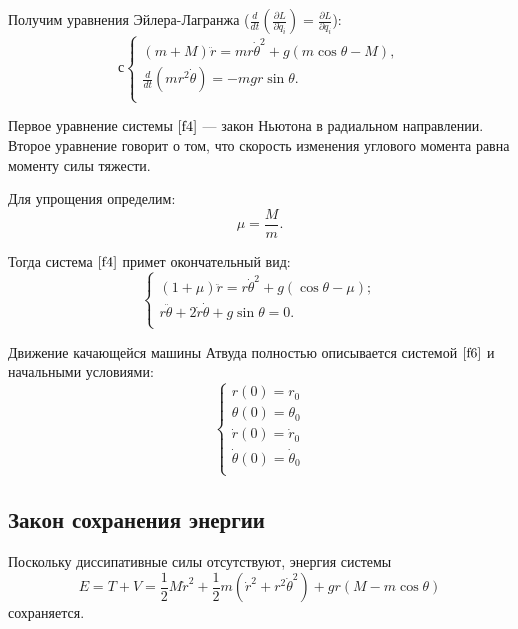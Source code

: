\documentclass[12pt]{article}
\numberwithin{equation}{section}
\begin{document}
Получим уравнения Эйлера-Лагранжа ($ \frac{d}{dt}(\frac{\partial L}{\partial \dot{q}_{i}}) = \frac{\partial L}{\partial q_{i}} $):
\begin{equation}\label{f4}
с\begin{cases}
(m+M)\ddot{r} = m r \dot{\theta}^{2}+g(m \cos\theta - M),\\
\frac{d}{dt}(mr^{2}\dot{\theta})=-mgr\sin\theta.\\
\end{cases}
\end{equation}

Первое уравнение системы $\ref{f4}$  — закон Ньютона в радиальном направлении. Второе уравнение говорит о том, что скорость изменения углового момента равна моменту силы тяжести.

Для упрощения определим:
\begin{equation}\label{f5}
\mu=\frac{M}{m}.
\end{equation}

Тогда система $\ref{f4}$ примет окончательный вид:
\begin{equation}\label{f6}
\begin{cases}
(1+\mu)\ddot{r} = r \dot{\theta}^{2}+g( \cos\theta - \mu);\\
r\ddot{\theta}+2 \dot{r} \dot{\theta}+ g \sin\theta=0.\\
\end{cases}
\end{equation}

Движение качающейся машины Атвуда полностью описывается системой $\ref{f6}$ и начальными условиями:
\begin{equation}\label{f7}
\begin{cases}
r(0)=r_{0}\\
\theta(0)=\theta_{0}\\
\dot r(0)=\dot r_{0}\\
\dot \theta(0)=\dot \theta_{0}\\
\end{cases}
\end{equation}
\subsection{Закон сохранения энергии}
Поскольку диссипативные силы отсутствуют, энергия системы
\begin{equation}\label{f8}
E=T+V=\frac{1}{2}M\dot{r}^{2}+\frac{1}{2}m (\dot{r}^{2}+r^{2}\dot{\theta}^{2})+gr(M-m \cos \theta)
\end{equation}
сохраняется.
\end{document}
